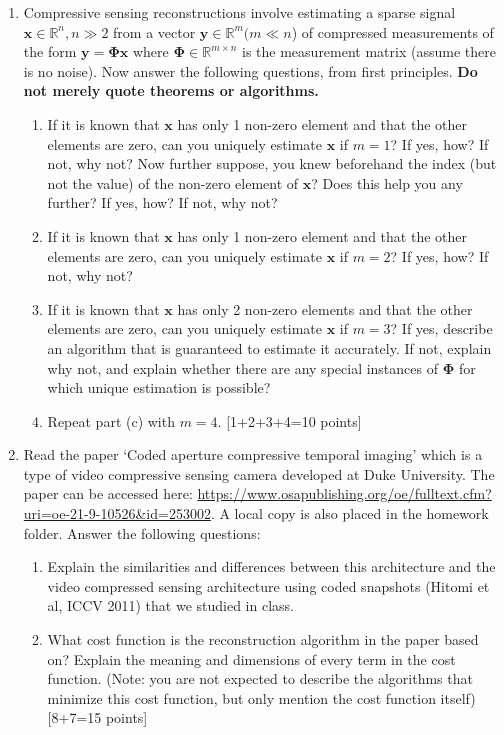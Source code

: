 \documentclass[11pt]{article}
\begin{document}
\begin{enumerate}
\item Compressive sensing reconstructions involve estimating a sparse signal $\mathbf{x} \in \mathbb{R}^n, n \gg 2$ from a vector $\mathbf{y} \in \mathbb{R}^m (m \ll n$) of compressed measurements of the form $\mathbf{y} = \mathbf{\Phi x}$ where $\mathbf{\Phi} \in \mathbb{R}^{m \times n}$ is the measurement matrix (assume there is no noise). Now answer the following questions, from first principles. \textbf{Do not merely quote theorems or algorithms.}
\begin{enumerate}
\item If it is known that $\mathbf{x}$ has only 1 non-zero element and that the other elements are zero, can you uniquely estimate $\mathbf{x}$ if $m = 1$? If yes, how? If not, why not? Now further suppose, you knew beforehand the index (but not the value) of the non-zero element of $\mathbf{x}$? Does this help you any further? If yes, how? If not, why not?
\item If it is known that $\mathbf{x}$ has only 1 non-zero element and that the other elements are zero, can you uniquely estimate $\mathbf{x}$ if $m = 2$? If yes, how? If not, why not? 
\item If it is known that $\mathbf{x}$ has only 2 non-zero elements and that the other elements are zero, can you uniquely estimate $\mathbf{x}$ if $m = 3$? If yes, describe an algorithm that is guaranteed to estimate it accurately. If not, explain why not, and explain whether there are any special instances of $\mathbf{\Phi}$ for which unique estimation is possible? 
\item Repeat part (c) with $m = 4$.  \textsf{[1+2+3+4=10 points]}
\end{enumerate} 

\item Read the paper `Coded aperture compressive temporal imaging' which is a type of video compressive sensing camera developed at Duke University. The paper can be accessed here: \url{https://www.osapublishing.org/oe/fulltext.cfm?uri=oe-21-9-10526&id=253002}. A local copy is also placed in the homework folder. Answer the following questions:
\begin{enumerate}
\item Explain the similarities and differences between this architecture and the video compressed sensing architecture using coded snapshots (Hitomi et al, ICCV 2011) that we studied in class. 
\item What cost function is the reconstruction algorithm in the paper based on? Explain the meaning and dimensions of every term in the cost function. (Note: you are not expected to describe the algorithms that minimize this cost function, but only mention the cost function itself) \textsf{[8+7=15 points]}
\end{enumerate} 


\end{enumerate}
\end{document}
